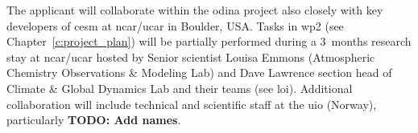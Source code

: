The applicant will collaborate within the \gls{odina} project also closely with key developers of \gls{cesm} at \gls{ncar}/\gls{ucar} in Boulder, USA. Tasks in \gls{wp}2 (see Chapter~\ref{c:project_plan}) will be partially performed during a 3~months research stay at \gls{ncar}/\gls{ucar} hosted by Senior scientist Louisa Emmons (Atmospheric Chemistry Observations \& Modeling Lab) and Dave Lawrence section head of Climate \& Global Dynamics Lab and their teams (see \gls{loi}). Additional collaboration will include technical and scientific staff at the \gls{uio} (Norway), particularly \textbf{TODO: Add names}. 
